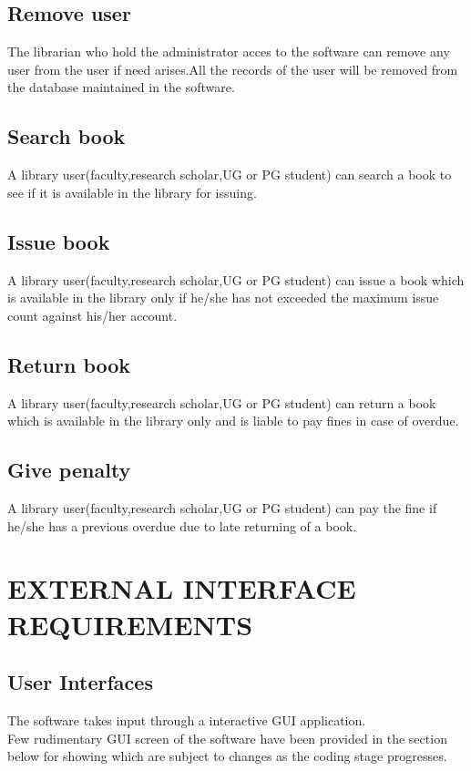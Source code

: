 \documentclass{article}
\begin{document}
\subsection{Remove user}
The librarian who hold the administrator acces to the software can remove any user from the user if need arises.All the records of the user will be removed from the database maintained in the software.
\subsection{Search book}
A library user(faculty,research scholar,UG or PG student) can search a book to see if it is available in the library for issuing.

\subsection{Issue book}
A library user(faculty,research scholar,UG or PG student) can issue a book which is available in the library only if he/she has not exceeded the maximum issue count against his/her account.
\subsection{Return book}
A library user(faculty,research scholar,UG or PG student) can return a book which is available in the library only and is liable to pay fines in case of overdue.

\subsection{Give penalty}
A library user(faculty,research scholar,UG or PG student) can pay the fine if he/she has a previous overdue due to late returning of a book.


\section{EXTERNAL INTERFACE REQUIREMENTS}
\subsection{User Interfaces}
The software takes input through a interactive GUI application.\\
Few rudimentary GUI screen of the software have been provided in the section below for showing which are subject to changes as the coding stage progresses.
\end{document}
